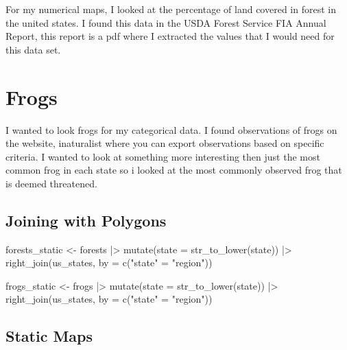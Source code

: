 \documentclass[
  letterpaper,
  DIV=11,
  numbers=noendperiod]{scrartcl}
\newenvironment{Shaded}{\begin{snugshade}}{\end{snugshade}}
\newcommand{\AttributeTok}[1]{\textcolor[rgb]{0.40,0.45,0.13}{#1}}
\newcommand{\FunctionTok}[1]{\textcolor[rgb]{0.28,0.35,0.67}{#1}}
\newcommand{\NormalTok}[1]{\textcolor[rgb]{0.00,0.23,0.31}{#1}}
\newcommand{\OtherTok}[1]{\textcolor[rgb]{0.00,0.23,0.31}{#1}}
\newcommand{\SpecialCharTok}[1]{\textcolor[rgb]{0.37,0.37,0.37}{#1}}
\newcommand{\StringTok}[1]{\textcolor[rgb]{0.13,0.47,0.30}{#1}}
\begin{document}
For my numerical maps, I looked at the percentage of land covered in
forest in the united states. I found this data in the USDA Forest
Service FIA Annual Report, this report is a pdf where I extracted the
values that I would need for this data set.

\section{Frogs}\label{frogs}

I wanted to look frogs for my categorical data. I found observations of
frogs on the website, inaturalist where you can export observations
based on specific criteria. I wanted to look at something more
interesting then just the most common frog in each state so i looked at
the most commonly observed frog that is deemed threatened.

\subsection{Joining with Polygons}\label{joining-with-polygons}

\begin{Shaded}
\begin{Highlighting}[]
\NormalTok{forests\_static }\OtherTok{\textless{}{-}}\NormalTok{ forests }\SpecialCharTok{|\textgreater{}}
  \FunctionTok{mutate}\NormalTok{(}\AttributeTok{state =} \FunctionTok{str\_to\_lower}\NormalTok{(state)) }\SpecialCharTok{|\textgreater{}}
  \FunctionTok{right\_join}\NormalTok{(us\_states, }\AttributeTok{by =} \FunctionTok{c}\NormalTok{(}\StringTok{"state"} \OtherTok{=} \StringTok{"region"}\NormalTok{)) }
\end{Highlighting}
\end{Shaded}

\begin{Shaded}
\begin{Highlighting}[]
\NormalTok{frogs\_static }\OtherTok{\textless{}{-}}\NormalTok{ frogs }\SpecialCharTok{|\textgreater{}}
  \FunctionTok{mutate}\NormalTok{(}\AttributeTok{state =} \FunctionTok{str\_to\_lower}\NormalTok{(state)) }\SpecialCharTok{|\textgreater{}}
  \FunctionTok{right\_join}\NormalTok{(us\_states, }\AttributeTok{by =} \FunctionTok{c}\NormalTok{(}\StringTok{"state"} \OtherTok{=} \StringTok{"region"}\NormalTok{))}
\end{Highlighting}
\end{Shaded}

\subsection{Static Maps}\label{static-maps}
\end{document}
